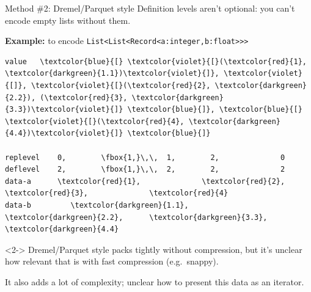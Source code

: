 \documentclass{beamer}
\begin{document}
\begin{frame}[fragile]{Method \#2: Dremel/Parquet style}
\vspace{0.5 cm}
Definition levels aren't optional: you can't encode empty lists without them.

\vspace{0.5 cm}
{\bf Example:} to encode {\tt\footnotesize List<List<Record<a:integer,b:float>>>}

\scriptsize\bf
\begin{Verbatim}[commandchars=\\\{\}]
value   \textcolor{blue}{[} \textcolor{violet}{[}(\textcolor{red}{1}, \textcolor{darkgreen}{1.1})\textcolor{violet}{]}, \textcolor{violet}{[]}, \textcolor{violet}{[}(\textcolor{red}{2}, \textcolor{darkgreen}{2.2}), (\textcolor{red}{3}, \textcolor{darkgreen}{3.3})\textcolor{violet}{]} \textcolor{blue}{]}, \textcolor{blue}{[} \textcolor{violet}{[}(\textcolor{red}{4}, \textcolor{darkgreen}{4.4})\textcolor{violet}{]} \textcolor{blue}{]}

replevel    0,        \fbox{1,}\,\,  1,        2,              0
deflevel    2,        \fbox{1,}\,\,  2,        2,              2
data-a      \textcolor{red}{1},              \textcolor{red}{2},        \textcolor{red}{3},              \textcolor{red}{4}
data-b         \textcolor{darkgreen}{1.1},            \textcolor{darkgreen}{2.2},      \textcolor{darkgreen}{3.3},            \textcolor{darkgreen}{4.4}
\end{Verbatim}

\normalsize\sf
\vspace{0.3 cm}
\begin{uncoverenv}<2->
Dremel/Parquet style packs tightly without compression, but it's unclear how relevant that is with fast compression (e.g.\ snappy).

\vspace{0.25 cm}
It also adds a lot of complexity; unclear how to present this data as an iterator.
\end{uncoverenv}
\end{frame}
\end{document}
